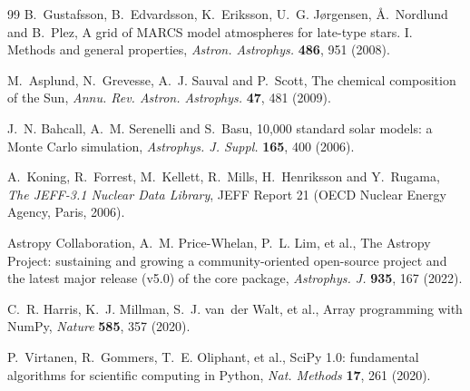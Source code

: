 \documentclass[3p,11pt]{elsarticle}
\begin{document}
\begin{thebibliography}{99}
B.~Gustafsson, B.~Edvardsson, K.~Eriksson, U.~G. J{\o}rgensen, {\AA}.~Nordlund and
B.~Plez, A grid of MARCS model atmospheres for late-type stars. I. Methods and general
properties, \emph{Astron. Astrophys.} \textbf{486}, 951 (2008).

M.~Asplund, N.~Grevesse, A.~J. Sauval and P.~Scott, The chemical composition of the
Sun, \emph{Annu. Rev. Astron. Astrophys.} \textbf{47}, 481 (2009).

J.~N. Bahcall, A.~M. Serenelli and S.~Basu, 10,000 standard solar models: a Monte Carlo
simulation, \emph{Astrophys. J. Suppl.} \textbf{165}, 400 (2006).

A.~Koning, R.~Forrest, M.~Kellett, R.~Mills, H.~Henriksson and Y.~Rugama, \emph{The
JEFF-3.1 Nuclear Data Library}, JEFF Report 21 (OECD Nuclear Energy Agency, Paris,
2006).

Astropy Collaboration, A.~M. Price-Whelan, P.~L. Lim, et al., The Astropy Project:
sustaining and growing a community-oriented open-source project and the latest major
release (v5.0) of the core package, \emph{Astrophys. J.} \textbf{935}, 167 (2022).

C.~R. Harris, K.~J. Millman, S.~J. van~der Walt, et al., Array programming with NumPy,
\emph{Nature} \textbf{585}, 357 (2020).

P.~Virtanen, R.~Gommers, T.~E. Oliphant, et al., SciPy 1.0: fundamental algorithms for
scientific computing in Python, \emph{Nat. Methods} \textbf{17}, 261 (2020).

\end{thebibliography}
\end{document}
